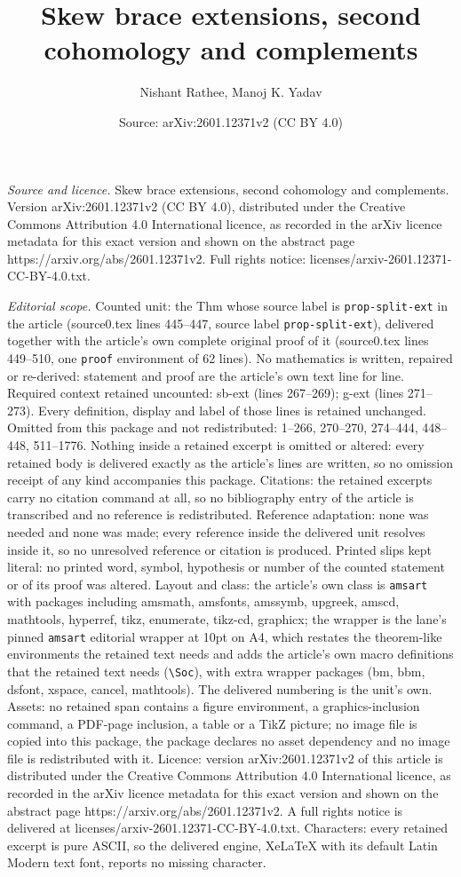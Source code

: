 \documentclass[10pt,a4paper]{amsart}
\title[Skew brace extensions, second cohomology and complements]{Skew brace extensions, second cohomology and complements}
\author{Nishant Rathee, Manoj K. Yadav}
\date{Source: arXiv:2601.12371v2 (CC BY 4.0)}
\begin{document}
\maketitle

\noindent\emph{Source and licence.} Skew brace extensions, second cohomology and complements. Version arXiv:2601.12371v2 (CC BY 4.0), distributed under the Creative Commons Attribution 4.0 International licence, as recorded in the arXiv licence metadata for this exact version and shown on the abstract page https://arxiv.org/abs/2601.12371v2. Full rights notice: licenses/arxiv-2601.12371-CC-BY-4.0.txt.\par\smallskip

\noindent\textit{Editorial scope.} Counted unit: the Thm whose source label is \texttt{prop-split-ext} in the article (source0.tex lines 445--447, source label \texttt{prop-split-ext}), delivered together with the article's own complete original proof of it (source0.tex lines 449--510, one \texttt{proof} environment of 62 lines). No mathematics is written, repaired or re-derived: statement and proof are the article's own text line for line. Required context retained uncounted: sb-ext (lines 267--269); g-ext (lines 271--273). Every definition, display and label of those lines is retained unchanged. Omitted from this package and not redistributed: 1--266, 270--270, 274--444, 448--448, 511--1776. Nothing inside a retained excerpt is omitted or altered: every retained body is delivered exactly as the article's lines are written, so no omission receipt of any kind accompanies this package. Citations: the retained excerpts carry no citation command at all, so no bibliography entry of the article is transcribed and no reference is redistributed. Reference adaptation: none was needed and none was made; every reference inside the delivered unit resolves inside it, so no unresolved reference or citation is produced. Printed slips kept literal: no printed word, symbol, hypothesis or number of the counted statement or of its proof was altered. Layout and class: the article's own class is \texttt{amsart} with packages including amsmath, amsfonts, amssymb, upgreek, amscd, mathtools, hyperref, tikz, enumerate, tikz-cd, graphicx; the wrapper is the lane's pinned \texttt{amsart} editorial wrapper at 10pt on A4, which restates the theorem-like environments the retained text needs and adds the article's own macro definitions that the retained text needs (\texttt{\textbackslash Soc}), with extra wrapper packages (bm, bbm, dsfont, xspace, cancel, mathtools). The delivered numbering is the unit's own. Assets: no retained span contains a figure environment, a graphics-inclusion command, a PDF-page inclusion, a table or a TikZ picture; no image file is copied into this package, the package declares no asset dependency and no image file is redistributed with it. Licence: version arXiv:2601.12371v2 of this article is distributed under the Creative Commons Attribution 4.0 International licence, as recorded in the arXiv licence metadata for this exact version and shown on the abstract page https://arxiv.org/abs/2601.12371v2. A full rights notice is delivered at licenses/arxiv-2601.12371-CC-BY-4.0.txt. Characters: every retained excerpt is pure ASCII, so the delivered engine, XeLaTeX with its default Latin Modern text font, reports no missing character.
\end{document}
